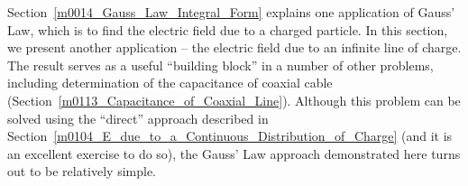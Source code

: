 

\label{m0149_E_due_to_Inf_Line_Charge} %

Section~\ref{m0014_Gauss_Law_Integral_Form} explains one application of Gauss' Law, which is to find the electric field due to a charged particle.
In this section, we present another application -- the electric field due to an infinite line of charge.
The result serves as a useful ``building block'' in a number of other problems, including determination of the capacitance of coaxial cable (Section~\ref{m0113_Capacitance_of_Coaxial_Line}).
Although this problem can be solved using the ``direct'' approach described in Section~\ref{m0104_E_due_to_a_Continuous_Distribution_of_Charge} (and it is an excellent exercise to do so), the Gauss' Law approach demonstrated here turns out to be relatively simple.

